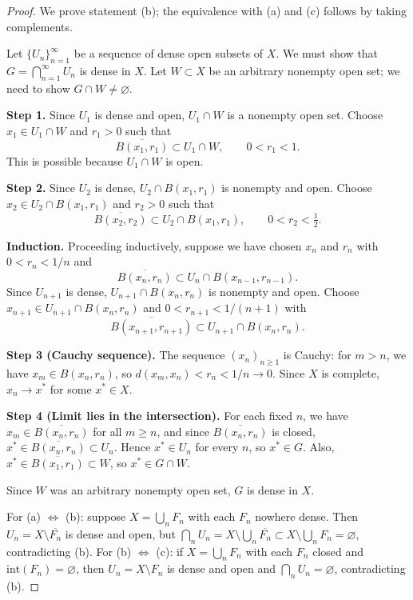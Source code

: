 \documentclass[a4paper,12pt]{book}
\theoremstyle{definition}
\theoremstyle{plain}
\theoremstyle{remark}
\begin{document}
\begin{proof}
We prove statement (b); the equivalence with (a) and (c) follows by taking complements.

Let $\{U_n\}_{n=1}^{\infty}$ be a sequence of dense open subsets of $X$. We must show
that $G = \bigcap_{n=1}^{\infty} U_n$ is dense in $X$. Let $W \subset X$ be an
arbitrary nonempty open set; we need to show $G \cap W \neq \varnothing$.

\textbf{Step 1.} Since $U_1$ is dense and open,
$U_1 \cap W$ is a nonempty open set. Choose $x_1 \in U_1 \cap W$ and $r_1 > 0$
such that
\[
  \overline{B(x_1, r_1)} \subset U_1 \cap W, \qquad 0 < r_1 < 1.
\]
This is possible because $U_1 \cap W$ is open.

\textbf{Step 2.} Since $U_2$ is dense, $U_2 \cap B(x_1, r_1)$ is nonempty and open.
Choose $x_2 \in U_2 \cap B(x_1, r_1)$ and $r_2 > 0$ such that
\[
  \overline{B(x_2, r_2)} \subset U_2 \cap B(x_1, r_1), \qquad 0 < r_2 < \tfrac{1}{2}.
\]

\textbf{Induction.} Proceeding inductively, suppose we have chosen $x_n$ and $r_n$ with
$0 < r_n < 1/n$ and
\[
  \overline{B(x_n, r_n)} \subset U_n \cap B(x_{n-1}, r_{n-1}).
\]
Since $U_{n+1}$ is dense, $U_{n+1} \cap B(x_n, r_n)$ is nonempty and open. Choose
$x_{n+1} \in U_{n+1} \cap B(x_n, r_n)$ and $0 < r_{n+1} < 1/(n+1)$ with
\[
  \overline{B(x_{n+1}, r_{n+1})} \subset U_{n+1} \cap B(x_n, r_n).
\]

\textbf{Step 3 (Cauchy sequence).} The sequence $(x_n)_{n \geq 1}$ is Cauchy: for
$m > n$, we have $x_m \in B(x_n, r_n)$, so $d(x_m, x_n) < r_n < 1/n \to 0$. Since
$X$ is complete, $x_n \to x^*$ for some $x^* \in X$.

\textbf{Step 4 (Limit lies in the intersection).} For each fixed $n$, we have
$x_m \in \overline{B(x_n, r_n)}$ for all $m \geq n$, and since
$\overline{B(x_n, r_n)}$ is closed, $x^* \in \overline{B(x_n, r_n)} \subset U_n$.
Hence $x^* \in U_n$ for every $n$, so $x^* \in G$. Also,
$x^* \in \overline{B(x_1, r_1)} \subset W$, so $x^* \in G \cap W$.

Since $W$ was an arbitrary nonempty open set, $G$ is dense in $X$.

For (a) $\Leftrightarrow$ (b): suppose $X = \bigcup_n F_n$ with each $F_n$ nowhere
dense. Then $U_n = X \setminus \overline{F_n}$ is dense and open, but
$\bigcap_n U_n = X \setminus \bigcup_n \overline{F_n}
\subset X \setminus \bigcup_n F_n = \varnothing$,
contradicting (b). For (b) $\Leftrightarrow$ (c): if $X = \bigcup_n F_n$ with each
$F_n$ closed and $\mathrm{int}(F_n) = \varnothing$, then $U_n = X \setminus F_n$ is
dense and open and $\bigcap_n U_n = \varnothing$, contradicting (b).
\end{proof}
\end{document}
